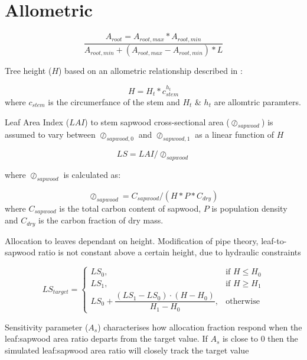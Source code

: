 \section{Allometric}
\label{Allometric}

\begin{equation}
	\frac{A_{root}=A_{root,max}*A_{root,min}}{A_{root,min}+(A_{root,max}-A_{root,min})*L}
\end{equation}

Tree height ($H$) based on an allometric relationship described in \citet{Causton1985}:

\begin{equation}
	H = H_{t} * c_{stem}^{h_{t}}
\end{equation}
where $c_{stem}$ is the circumerfance of the stem and $H_{t}$ \& $h_{t}$ are allomtric paramters.
                                
Leaf Area Index ($LAI$) to stem sapwood cross-sectional area ($\oslash_{sapwood}$) is assumed to vary between $\oslash_{sapwood,0}$ and $\oslash_{sapwood,1}$ as a linear function of $H$ 

\begin{equation}
	LS = LAI / \oslash_{sapwood}
\end{equation}

where $\oslash_{sapwood}$ is calculated as:

\begin{equation}
	\oslash_{sapwood} = C_{sapwood}/(H * P *C_{dry} )
\end{equation}
where $C_{sapwood}$ is the total carbon content of sapwood, $P$ is population density and $C_{dry}$ is the carbon fraction of dry mass.

Allocation to leaves dependant on height. Modification of pipe theory, leaf-to-sapwood ratio is not constant above a certain  height, due to hydraulic constraints \citep{magnani2000age,Deckmyn2006}

\begin{equation}
	LS_{target}=
	\begin{cases}
		    LS_{0},& \text{if } H\le H_{0} \\ 
		    LS_{1},& \text{if } H\ge H_{1} \\
		    LS_{0} + \dfrac{(LS_{1}-LS_{0})\cdot (H-H_{0})}{H_{1}-H_{0}},& \text{otherwise}
		\end{cases}
\end{equation}

Sensitivity parameter ($A_{s}$) characterises how allocation fraction respond when the leaf:sapwood area ratio departs from the target value. If $A_{s}$ is close to 0 then the simulated leaf:sapwood area ratio will closely track the target value

